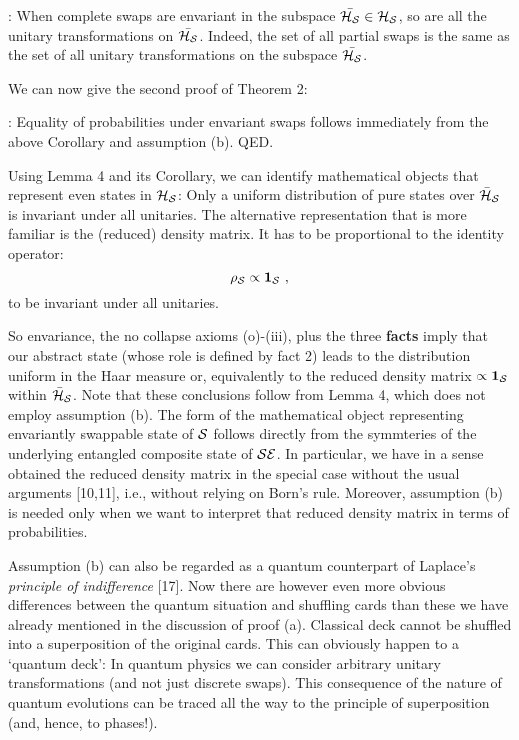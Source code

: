 \documentclass[aps,pra,epsfig,11pt,floatfix]{revtex4}
\begin{document}
: When complete swaps are envariant in the subspace
$\bar {\cal H_S} \in {\cal H_S}$, so are all the unitary transformations on
$\bar {\cal H_S}$. Indeed, the set of all partial swaps is the same
as the set of all unitary transformations on the subspace $\bar {\cal H_S}$.

We can now give the second proof of Theorem 2:

: Equality of probabilities under envariant swaps
follows immediately from the above Corollary and assumption (b). QED.

Using Lemma 4 and its Corollary, we can identify mathematical objects that
represent even states in ${\cal H_S}$: Only a uniform  distribution of pure
states over $\bar {\cal H}_{\cal S}$ is invariant under all unitaries.
The alternative representation that is more familiar is the (reduced)
density matrix. It has to be proportional to the identity operator:
$$ \rho_{\cal S} \propto {\bf 1}_{\cal S} \ , $$
to be invariant under all unitaries.

So envariance, the no collapse axioms (o)-(iii), plus the three {\bf facts}
imply that our abstract state (whose role is defined by fact 2) leads to
the distribution uniform in the Haar measure or, equivalently to the reduced
density matrix $\propto{\bf 1}_{\cal S}$ within $\bar {\cal H}_{\cal S}$. Note
that these conclusions follow from Lemma 4, which does not employ assumption
(b). The form of the mathematical object representing envariantly swappable
state of ${\cal S}$ follows directly from the symmteries of the underlying
entangled composite state of ${\cal SE}$. In particular, we have in a sense
obtained the reduced density matrix in the special case without the usual
arguments [10,11], i.e., without relying on Born's rule. Moreover, assumption
(b) is needed only when we want to interpret that reduced density matrix
in terms of probabilities.

Assumption (b) can also be regarded as a quantum counterpart of
Laplace's {\it principle of indifference} [17]. Now there are however even
more obvious differences between the quantum situation and shuffling cards
than these we have already mentioned in the discussion of proof (a). Classical 
deck cannot be shuffled into a superposition of the original cards. This can 
obviously happen to a `quantum deck': In quantum physics we can 
consider arbitrary unitary transformations (and not just discrete
swaps). This consequence of the nature of quantum evolutions can be traced all
the way to the principle of superposition (and, hence, to phases!).  
\end{document}
